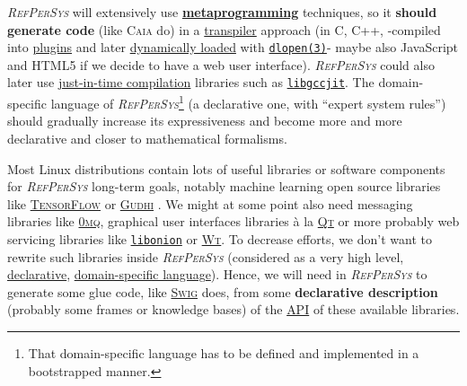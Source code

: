 \documentclass{IEEEtran}
\newcommand{\RefPerSys}{{\textit{\textsc{RefPerSys}}}}
\begin{document}
{\RefPerSys} will extensively use
\href{https://en.wikipedia.org/wiki/Metaprogramming}{\textbf{metaprogramming}}
techniques, so it \textbf{should generate code} (like \textsc{Caia}
do) in a
\href{https://en.wikipedia.org/wiki/Source-to-source_compiler}{transpiler}
approach (in C, C++, -compiled into
\href{https://en.wikipedia.org/wiki/Plug-in\_(computing)}{plugins} and
later
\href{https://en.wikipedia.org/wiki/Dynamic\_loading}{dynamically
  loaded} with \href{}{\texttt{dlopen(3)}}- maybe also JavaScript and
HTML5 if we decide to have a web user interface). {\RefPerSys} could
also later use
\href{https://en.wikipedia.org/wiki/Just-in-time_compilation}{just-in-time
  compilation} libraries such as
\href{https://gcc.gnu.org/onlinedocs/jit/}{\texttt{libgccjit}}. The
domain-specific language of \RefPerSys\footnote{That domain-specific
language has to be defined and implemented in a bootstrapped manner.}
(a declarative one, with ``expert system rules'') should gradually
increase its expressiveness and become more and more declarative and
closer to mathematical formalisms.

Most Linux distributions contain lots of useful libraries or software
components for {\RefPerSys} long-term goals, notably machine learning
open source libraries like
\href{https://www.tensorflow.org/}{\textsc{TensorFlow}}
\cite{charniak:2019:deep-learning, shalev:2014:understanding} or
\href{https://gudhi.inria.fr/}{\textsc{Gudhi}}
\cite{chazal:2016:high}. We might at some point also need messaging
libraries like \href{https://zeromq.org/}{\textsc{0mq}}, graphical
user interfaces libraries à la \href{http://qt.io/}{\textsc{Qt}} or
more probably web servicing libraries like
\href{https://github.com/davidmoreno/onion/}{\texttt{libonion}} or
\href{https://www.webtoolkit.eu/wt}{\textsc{Wt}}. To decrease efforts,
we don't want to rewrite such libraries inside {\RefPerSys}
(considered as a very high level,
\href{https://en.wikipedia.org/wiki/Declarative\_programming}{declarative},
\href{https://en.wikipedia.org/wiki/Domain-specific\_language}{domain-specific
  language}). Hence, we will need in {\RefPerSys} to generate some
glue code, like \href{http://swig.org/}{\textsc{Swig}} does, from some
\textbf{declarative description} (probably some frames or knowledge
bases) of the
\href{https://en.wikipedia.org/wiki/Application_programming_interface}{API}
of these available libraries.
\end{document}
